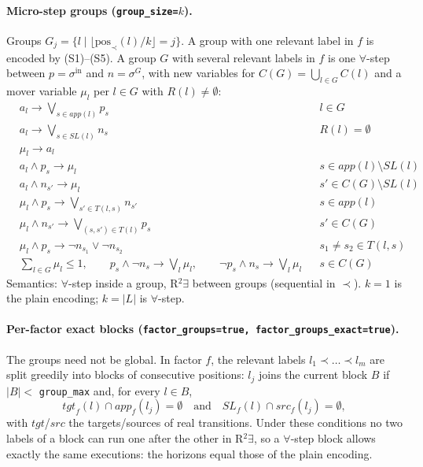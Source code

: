 \documentclass[11pt,a4paper]{article}
\newcommand{\lab}[1]{a_{#1}}            %
\newcommand{\SL}{\mathit{SL}}
\newcommand{\R}{R}
\newcommand{\src}{\mathit{src}}
\newcommand{\tgt}{\mathit{tgt}}
\newcommand{\app}{\mathit{app}}
\begin{document}
\paragraph{Micro-step groups (\texttt{group\_size=}$k$).} Groups
$G_j = \{l \mid \lfloor \mathrm{pos}_\prec(l)/k \rfloor = j\}$. A group with one relevant label in
$f$ is encoded by (S1)--(S5). A group $G$ with several relevant labels in $f$ is one
$\forall$-step between $p = \sigma^{\mathrm{in}}$ and $n = \sigma^G$, with new variables for
$C(G) = \bigcup_{l \in G} C(l)$ and a mover variable $\mu_l$ per $l \in G$ with $\R(l) \neq \emptyset$:
\begin{align}
  &\lab{l} \to \textstyle\bigvee_{s \in \app(l)} p_s && l \in G \tag{G1}\\
  &\lab{l} \to \textstyle\bigvee_{s \in \SL(l)} n_s && \R(l) = \emptyset \tag{G2}\\
  &\mu_l \to \lab{l} \tag{G3}\\
  &\lab{l} \wedge p_s \to \mu_l && s \in \app(l) \setminus \SL(l) \tag{G4}\\
  &\lab{l} \wedge n_{s'} \to \mu_l && s' \in C(G) \setminus \SL(l) \tag{G5}\\
  &\mu_l \wedge p_s \to \textstyle\bigvee_{s' \in T(l,s)} n_{s'} && s \in \app(l) \tag{G6}\\
  &\mu_l \wedge n_{s'} \to \textstyle\bigvee_{(s,s') \in T(l)} p_s && s' \in C(G) \tag{G7}\\
  &\mu_l \wedge p_s \to \neg n_{s_1} \vee \neg n_{s_2} && s_1 \neq s_2 \in T(l,s) \tag{G8}\\
  &\textstyle\sum_{l \in G} \mu_l \le 1,\qquad
   p_s \wedge \neg n_s \to \bigvee_{l} \mu_l,\qquad \neg p_s \wedge n_s \to \bigvee_l \mu_l
   && s \in C(G) \tag{G9}
\end{align}
Semantics: $\forall$-step inside a group, R$^2\exists$ between groups (sequential in $\prec$).
$k = 1$ is the plain encoding; $k = |L|$ is $\forall$-step.

\paragraph{Per-factor exact blocks (\texttt{factor\_groups=true, factor\_groups\_exact=true}).}
The groups need not be global. In factor $f$, the relevant labels $l_1 \prec \dots \prec l_m$ are
split greedily into blocks of consecutive positions: $l_j$ joins the current block $B$ if
$|B| <$ \texttt{group\_max} and, for every $l \in B$,
\[
  \tgt_f(l) \cap \app_f(l_j) = \emptyset \quad\text{and}\quad \SL_f(l) \cap \src_f(l_j) = \emptyset,
\]
with $\tgt$/$\src$ the targets/sources of real transitions. Under these conditions no two labels
of a block can run one after the other in R$^2\exists$, so a $\forall$-step block allows exactly
the same executions: the horizons equal those of the plain encoding.
\end{document}
